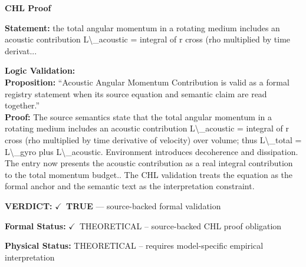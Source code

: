 \vspace{0.45em}
\noindent\textbf{CHL Proof}\par
\textbf{Statement:} the total angular momentum in a rotating medium includes an acoustic contribution
L\textbackslash{}\_acoustic = integral of r cross (rho multiplied by time derivat...

\textbf{Logic Validation:}\\
\textbf{Proposition:} ``Acoustic Angular Momentum Contribution is valid as a formal registry statement when its
source equation and semantic claim are read together.''\\
\textbf{Proof:} The source semantics state that the total angular momentum in a rotating medium includes
an acoustic contribution L\textbackslash{}\_acoustic = integral of r cross (rho multiplied by time
derivative of velocity) over volume; thus L\textbackslash{}\_total = L\textbackslash{}\_gyro plus L\textbackslash{}\_acoustic.
Environment introduces decoherence and dissipation. The entry now presents the acoustic
contribution as a real integral contribution to the total momentum budget.. The CHL
validation treats the equation as the formal anchor and the semantic text as the
interpretation constraint.

\textbf{VERDICT:} \ensuremath{\checkmark}\ \textbf{TRUE} --- source-backed formal validation

\textbf{Formal Status:} \ensuremath{\checkmark}\ THEORETICAL -- source-backed CHL proof obligation

\textbf{Physical Status:} THEORETICAL -- requires model-specific empirical interpretation
\par\vspace{0.45em}
\par
\ifTZPDarkEdition
{}
\fi
\endgroup
\endgroup
